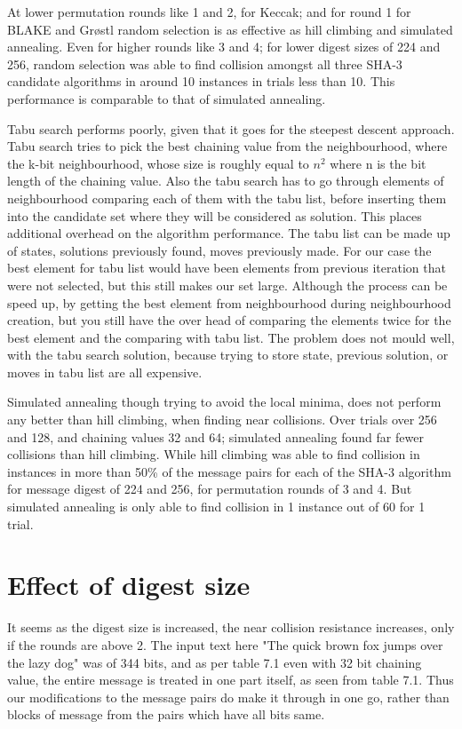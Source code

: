 At lower permutation rounds like 1 and 2, for Keccak; and for round 1 for BLAKE and Gr{\o}stl random selection is as 
effective as hill climbing and simulated annealing. Even for higher rounds like 3 and 4; for lower digest sizes of 224
and 256, random selection was able to find collision amongst all three SHA-3 candidate algorithms in around 10 instances 
in trials less than 10. This performance is comparable to that of simulated annealing.

Tabu search performs poorly, given that it goes for the steepest descent approach. Tabu search tries to pick the best 
chaining value from the neighbourhood, where the k-bit neighbourhood, whose size is roughly equal to $n^{2}$ where n
is the bit length of the chaining value. Also the tabu search has to go through elements of neighbourhood comparing each
of them with the tabu list, before inserting them into the candidate set where they will be considered as solution.
This places additional overhead on the algorithm performance. The tabu list can be made up of states, solutions previously
found, moves previously made. For our case the best element for tabu list would have been elements from previous iteration
that were not selected, but this still makes our set large. Although the process can be speed up, by getting the best
element from neighbourhood during neighbourhood creation, but you still have the over head of comparing the elements
twice for the best element and the comparing with tabu list. The problem does not mould well, with the tabu search
solution, because trying to store state, previous solution, or moves in tabu list are all expensive.

Simulated annealing though trying to avoid the local minima, does not perform any better than hill climbing, when finding
near collisions. Over trials over 256 and 128, and chaining values 32 and 64; simulated annealing found far fewer collisions
than hill climbing. While hill climbing was able to find collision in instances in more than 50\% of the message
pairs for each of the SHA-3 algorithm for message digest of 224 and 256, for permutation rounds of 3 and 4. But 
simulated annealing is only able to find collision in 1 instance out of 60 for 1 trial.

\section{Effect of digest size}

It seems as the digest size is increased, the near collision resistance increases, only if the rounds are above 2. The
input text here "The quick brown fox jumps over the lazy dog" was of 344 bits, and as per table 7.1 even with 32 bit
chaining value, the entire message is treated in one part itself, as seen from table 7.1. Thus our modifications to 
the message pairs do make it through in one go, rather than blocks of message from the pairs which have all bits same.

